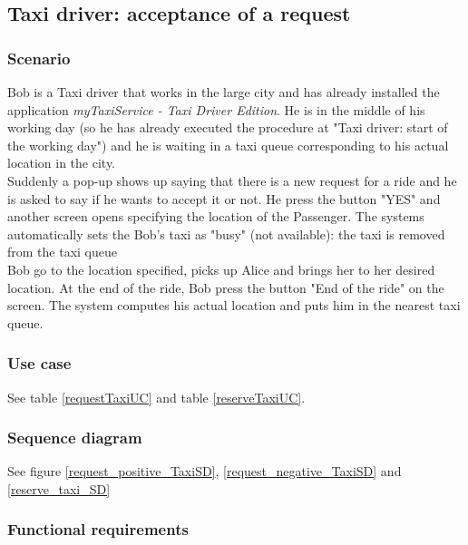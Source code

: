 \subsection{Taxi driver: acceptance of a request}
\subsubsection{Scenario}
Bob is a Taxi driver that works in the large city and has already installed the application \textit{myTaxiService - Taxi Driver Edition}.
He is in the middle of his working day (so he has already executed the procedure at "Taxi driver: start of the working day") and he is waiting in a taxi queue corresponding to his actual location in the city.\\
Suddenly a pop-up shows up saying that there is a new request for a ride and he is asked to say if he wants to accept it or not.
He press the button "YES" and another screen opens specifying the location of the Passenger. The systems automatically sets the Bob's taxi as "busy" (not available): the taxi is removed from the taxi queue\\
Bob go to the location specified, picks up Alice and brings her to her desired location. At the end of the ride, Bob press the button "End of the ride" on the screen. The system computes his actual location and puts him in the nearest taxi queue.

\subsubsection{Use case}
See table \ref{requestTaxiUC} and table \ref{reserveTaxiUC}.

\subsubsection{Sequence diagram}
See figure \ref{request_positive_TaxiSD}, \ref{request_negative_TaxiSD} and \ref{reserve_taxi_SD}

\subsubsection{Functional requirements}

